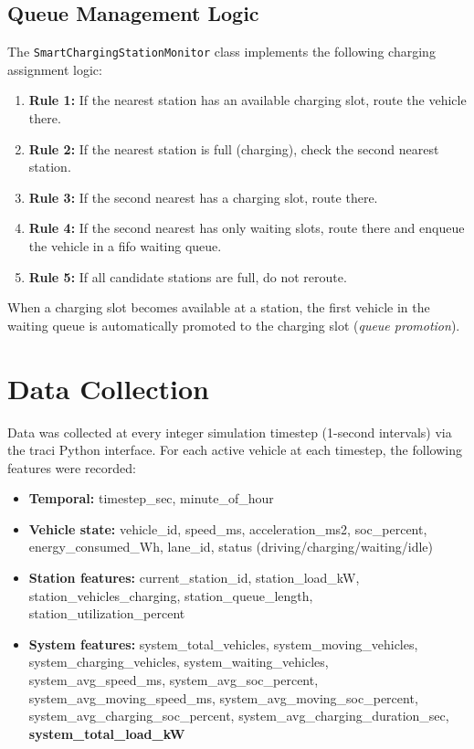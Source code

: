 \documentclass{thesis-library}
\begin{document}
\subsection{Queue Management Logic}

The \texttt{SmartChargingStationMonitor} class implements the following charging
assignment logic:

\begin{enumerate}
  \item \textbf{Rule 1:} If the nearest station has an available charging slot, route the
        vehicle there.
  \item \textbf{Rule 2:} If the nearest station is full (charging), check the second
        nearest station.
  \item \textbf{Rule 3:} If the second nearest has a charging slot, route there.
  \item \textbf{Rule 4:} If the second nearest has only waiting slots, route there and
        enqueue the vehicle in a \Gls{fifo} waiting queue.
  \item \textbf{Rule 5:} If all candidate stations are full, do not reroute.
\end{enumerate}

When a charging slot becomes available at a station, the first vehicle in the waiting
queue is automatically promoted to the charging slot (\textit{queue promotion}).

\section{Data Collection}

Data was collected at every integer simulation timestep (1-second intervals) via the
\Gls{traci} Python interface. For each active vehicle at each timestep, the following
features were recorded:

\begin{itemize}
  \item \textbf{Temporal:} timestep\_sec, minute\_of\_hour
  \item \textbf{Vehicle state:} vehicle\_id, speed\_ms, acceleration\_ms2, soc\_percent,
        energy\_consumed\_Wh, lane\_id, status (driving/charging/waiting/idle)
  \item \textbf{Station features:} current\_station\_id, station\_load\_kW,
        station\_vehicles\_charging, station\_queue\_length, station\_utilization\_percent
  \item \textbf{System features:} system\_total\_vehicles, system\_moving\_vehicles,
        system\_charging\_vehicles, system\_waiting\_vehicles, system\_avg\_speed\_ms,
        system\_avg\_soc\_percent, system\_avg\_moving\_speed\_ms,
        system\_avg\_moving\_soc\_percent, system\_avg\_charging\_soc\_percent,
        system\_avg\_charging\_duration\_sec, \textbf{system\_total\_load\_kW}
\end{itemize}
\end{document}
